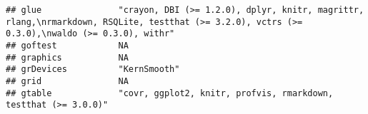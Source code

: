\documentclass[
]{article}
\begin{document}
\begin{verbatim}
## glue               "crayon, DBI (>= 1.2.0), dplyr, knitr, magrittr, rlang,\nrmarkdown, RSQLite, testthat (>= 3.2.0), vctrs (>= 0.3.0),\nwaldo (>= 0.3.0), withr"                                                                                                                                                                                                                                                                                                                                     
## goftest            NA                                                                                                                                                                                                                                                                                                                                                                                                                                                                                
## graphics           NA                                                                                                                                                                                                                                                                                                                                                                                                                                                                                
## grDevices          "KernSmooth"                                                                                                                                                                                                                                                                                                                                                                                                                                                                      
## grid               NA                                                                                                                                                                                                                                                                                                                                                                                                                                                                                
## gtable             "covr, ggplot2, knitr, profvis, rmarkdown, testthat (>= 3.0.0)"                                                                                                                                                                                                                                                                                                                                                                                                                   

\end{verbatim}
\end{document}
